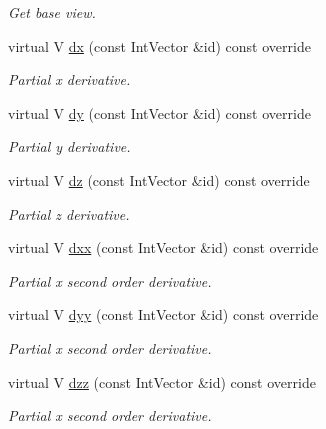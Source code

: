 \begin{DoxyCompactItemize}
\begin{DoxyCompactList}\small\item\em Get base view. \end{DoxyCompactList}\item 
virtual V \hyperlink{classUintah_1_1PhaseField_1_1detail_1_1bc__basic__fd__view_3_01ScalarField_3_01T_01_4_00_01STN_00_01VAR_00_01P_01_4_ae734fd388d7a680aa366db584bc54107}{dx} (const Int\+Vector \&id) const override
\begin{DoxyCompactList}\small\item\em Partial x derivative. \end{DoxyCompactList}\item 
virtual V \hyperlink{classUintah_1_1PhaseField_1_1detail_1_1bc__basic__fd__view_3_01ScalarField_3_01T_01_4_00_01STN_00_01VAR_00_01P_01_4_ad81ac1a8cf3ddce875d270b6bb00a380}{dy} (const Int\+Vector \&id) const override
\begin{DoxyCompactList}\small\item\em Partial y derivative. \end{DoxyCompactList}\item 
virtual V \hyperlink{classUintah_1_1PhaseField_1_1detail_1_1bc__basic__fd__view_3_01ScalarField_3_01T_01_4_00_01STN_00_01VAR_00_01P_01_4_a994e7388acdb4040da7cc438ecd2dc4b}{dz} (const Int\+Vector \&id) const override
\begin{DoxyCompactList}\small\item\em Partial z derivative. \end{DoxyCompactList}\item 
virtual V \hyperlink{classUintah_1_1PhaseField_1_1detail_1_1bc__basic__fd__view_3_01ScalarField_3_01T_01_4_00_01STN_00_01VAR_00_01P_01_4_a7146569da689f425b7eb963295905ee2}{dxx} (const Int\+Vector \&id) const override
\begin{DoxyCompactList}\small\item\em Partial x second order derivative. \end{DoxyCompactList}\item 
virtual V \hyperlink{classUintah_1_1PhaseField_1_1detail_1_1bc__basic__fd__view_3_01ScalarField_3_01T_01_4_00_01STN_00_01VAR_00_01P_01_4_a5549a4a413c2be230e484c8921524395}{dyy} (const Int\+Vector \&id) const override
\begin{DoxyCompactList}\small\item\em Partial x second order derivative. \end{DoxyCompactList}\item 
virtual V \hyperlink{classUintah_1_1PhaseField_1_1detail_1_1bc__basic__fd__view_3_01ScalarField_3_01T_01_4_00_01STN_00_01VAR_00_01P_01_4_ad2c322a2540d22bffda0332f436df825}{dzz} (const Int\+Vector \&id) const override
\begin{DoxyCompactList}\small\item\em Partial x second order derivative. \end{DoxyCompactList}\end{DoxyCompactItemize}
